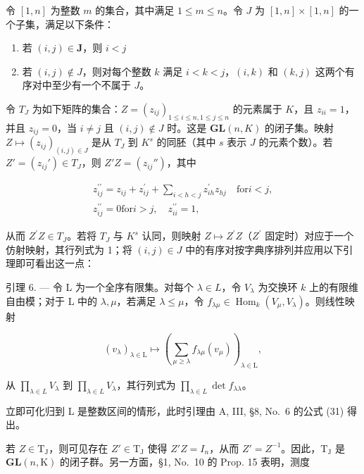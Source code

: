 令 \([1, n]\) 为整数 \(m\) 的集合，其中满足 \(1 \leqslant m \leqslant n\)。令 \(J\) 为 \([1, n] \times [1, n]\) 的一个子集，满足以下条件：

\begin{enumerate}
\def\labelenumi{\arabic{enumi})}
\item
  若 \((i,j)\in \mathbf{J}\)，则 \(i <   j\)
\item
  若 \((i,j)\notin J\)，则对每个整数 \(k\) 满足 \(i < k < j\)，\((i,k)\) 和 \((k,j)\) 这两个有序对中至少有一个不属于 \(J\)。
\end{enumerate}

令 \(T_J\) 为如下矩阵的集合：\(Z = (z_{ij})_{1 \leqslant i \leqslant n, 1 \leqslant j \leqslant n}\) 的元素属于 \(K\)，且 \(z_{ii} = 1\)，并且 \(z_{ij} = 0\)，当 \(i \neq j\) 且 \((i,j) \notin J\) 时。这是 \(\mathbf{GL}(n,K)\) 的闭子集。映射 \(Z \mapsto (z_{ij})_{(i,j) \in J}\) 是从 \(T_J\) 到 \(K^s\) 的同胚（其中 \(s\) 表示 \(J\) 的元素个数）。若 \(Z' = (z_{ij}') \in T_J\)，则 \(Z'Z = (z_{ij}'')\)，其中

\[
\begin{array}{c} z _ {i j} ^ {\prime \prime} = z _ {i j} + z _ {i j} ^ {\prime} + \sum_ {i <   h <   j} z _ {i h} ^ {\prime} z _ {h j} \quad \text {for} i <   j, \\ z _ {i j} ^ {\prime \prime} = 0 \text {for} i > j, \quad z _ {i i} ^ {\prime \prime} = 1, \end{array}
\]

从而 \(Z^{\prime}Z \in T_{J}\)。若将 \(T_{J}\) 与 \(K^{s}\) 认同，则映射 \(Z \mapsto Z^{\prime}Z\)（\(Z^{\prime}\) 固定时）对应于一个仿射映射，其行列式为 1；将 \((i,j) \in J\) 中的有序对按字典序排列并应用以下引理即可看出这一点：

引理 6. --- 令 L 为一个全序有限集。对每个 \(\lambda \in L\)，令 \(V_{\lambda}\) 为交换环 \(k\) 上的有限维自由模；对于 L 中的 \(\lambda, \mu\)，若满足 \(\lambda \leqslant \mu\)，令 \(f_{\lambda \mu} \in \operatorname{Hom}_k(V_\mu, V_\lambda)\)。则线性映射

\[
(v _ {\lambda}) _ {\lambda \in \mathrm{L}} \mapsto \left(\sum_ {\mu \geqslant \lambda} f _ {\lambda \mu} (v _ {\mu})\right) _ {\lambda \in \mathrm{L}},
\]

从 \(\prod_{\lambda \in L}V_{\lambda}\) 到 \(\prod_{\lambda \in L}V_{\lambda}\)，其行列式为 \(\prod_{\lambda \in L}\det f_{\lambda \lambda}\)。

立即可化归到 L 是整数区间的情形，此时引理由 A, III, §8, No.~6 的公式 (31) 得出。

若 \(Z \in \mathrm{T}_{\mathrm{J}}\)，则可见存在 \(Z' \in \mathrm{T}_{\mathrm{J}}\) 使得 \(Z'Z = I_n\)，从而 \(Z' = Z^{-1}\)。因此，\(\mathrm{T}_{\mathrm{J}}\) 是 \(\mathbf{GL}(n,\mathrm{K})\) 的闭子群。另一方面，§1, No.~10 的 Prop. 15 表明，测度

